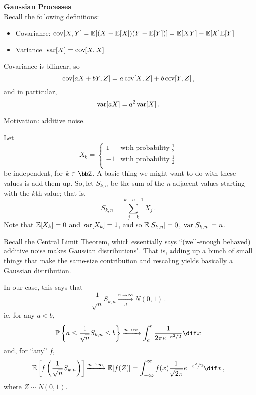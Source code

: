 \documentclass[../../../Master/AppliedStochastics.tex]{subfiles}
\author{Fill Staley}
\date{24 September 2018}
\begin{document}
%


\makelecture


\textbf{\Large Gaussian Processes}\\

Recall the following definitions:
\begin{itemize}
    \item Covariance: $\operatorname{cov}[X,Y]=\mathbb{E}[(X-\mathbb{E}[X])(Y-\mathbb{E}[Y])]=\mathbb{E}[XY]-\mathbb{E}[X]\mathbb{E}[Y]$
    
    \item Variance: $\operatorname{var}[X]=\operatorname{cov}[X,X]$
\end{itemize}


Covariance is bilinear, so
\begin{equation*}
    \operatorname{cov}[a X + b Y, Z] = a \operatorname{cov}[X, Z] + b\operatorname{cov}[Y, Z]\,,
\end{equation*}
    and in particular,
\begin{equation*}
    \operatorname{var}[aX]=a^2\operatorname{var}[X]\,.
\end{equation*}


Motivation: additive noise.


Let
\begin{equation*}
    X_k=\left\{\begin{array}{cc}
        1 &\text{with probability }\frac{1}{2}\\
       -1 & \text{with probability }\frac{1}{2}\\
\end{array}\right.
\end{equation*}
    be independent, for $k \in \bbZ$.
A basic thing we might want to do with these values is add them up.
So, let $S_{k, n}$ be the sum of the $n$ adjacent values
    starting with the $k$th value; that is,
\begin{equation*}
    S_{k, n} = \sum_{j = k}^{k + n - 1} X_j\,.
\end{equation*}
Note that $\mathbb{E}[X_k] = 0$ and $\operatorname{var}[X_k] = 1$,
    and so $\mathbb{E}[S_{k, n}] = 0$, $\operatorname{var}[S_{k, n}] = n$.


Recall the Central Limit Theorem,
    which essentially says ``(well-enough behaved) additive noise
        makes Gaussian distributions".
That is, adding up a bunch of small things that make the same-size contribution
    and rescaling yields basically a Gaussian distribution.


In our case, this says that 
\begin{equation*}
    \frac{1}{\sqrt{n}}S_{k,n}\xrightarrow[d]{n\to\infty} N(0,1)\,.
\end{equation*}
    ie. for any $a < b$,
\begin{equation*}
    \P\left\{a \leq \frac{1}{\sqrt{n}} S_{k, n} \leq b\right\}
        \xrightarrow{n\to\infty} \int_a^b \frac{1}{2\pi e^{-x^2/2}} \dif x
\end{equation*}
    and, for ``any'' $f$, 
\begin{equation}
    \E\left[f \left(\frac{1}{\sqrt{n}} S_{k, n}\right)\right]
        \xrightarrow{n\to\infty} \E[f(Z)]
        = \int_{-\infty}^\infty f(x) \frac{1}{\sqrt{2\pi}} e^{-x^2/2} \dif x\,,
\end{equation}
    where $Z\sim N(0,1)$.
\end{document}
